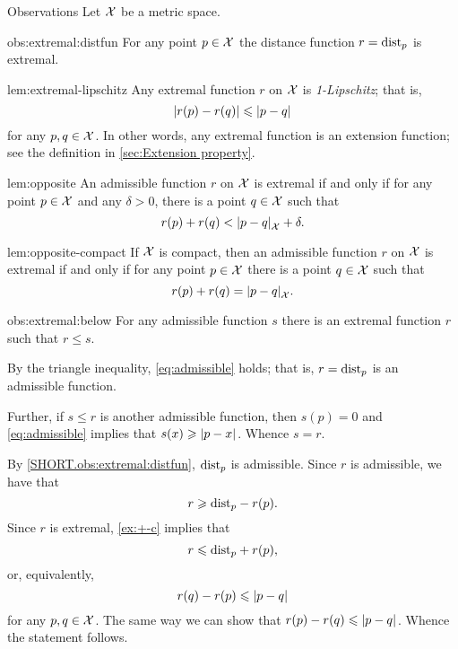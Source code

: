 \begin{thm}{Observations}\label{obs:extremal}
Let $\mathcal{X}$ be a metric space.

\begin{subthm}{obs:extremal:distfun}
For any point $p\in\mathcal{X}$
the distance function $r\z=\distfun_p$ is extremal.
\end{subthm}

\begin{subthm}{lem:extremal-lipschitz}
Any extremal function $r$ on $\mathcal{X}$ is \emph{1-Lipschitz};
that is,
\[|r(p)-r(q)|\le \dist{p}{q}{}\]
for any $p,q\in\mathcal{X}$.
In other words, any extremal function is an extension function; see the definition in \ref{sec:Extension property}.
\end{subthm}

\begin{subthm}{lem:opposite}
An admissible function $r$ on $\mathcal{X}$ is extremal if and only if
for any point $p\in\mathcal{X}$ and any $\delta>0$, there is a point $q\in \mathcal{X}$
such that 
\[r(p)+r(q)<\dist{p}{q}{\spc{X}}+\delta.\]
\end{subthm}

\begin{subthm}{lem:opposite-compact}
If $\mathcal{X}$ is compact, then an admissible function $r$ on $\mathcal{X}$ is extremal if and only if
for any point $p\in\mathcal{X}$ there is a point $q\in \mathcal{X}$
such that 
\[r(p)+r(q)=\dist{p}{q}{\spc{X}}.\]
\end{subthm}



\begin{subthm}{obs:extremal:below}
For any admissible function $s$ there is an extremal function $r$ such that $r\le s$.
\end{subthm}

\end{thm}

By the triangle inequality, \ref{eq:admissible} holds;
that is, $r=\mathrm{dist}_p$ is an admissible function.

Further, if $s\le r$ is another admissible function, then $s(p)=0$ and \ref{eq:admissible} implies that $s(x)\z\ge\dist{p}{x}{}$.
Whence $s=r$.

By \ref{SHORT.obs:extremal:distfun}, $\mathrm{dist}_p$ is admissible.
Since $r$ is admissible, we have that
\[r\geqslant \mathrm{dist}_p-r(p).\]
Since $r$ is extremal, \ref{ex:+-c} implies that
\[r\leqslant \mathrm{dist}_p+r(p),\]
or, equivalently,
\[r(q)-r(p)\le \dist{p}{q}{}\]
for any $p,q\in\mathcal{X}$.
The same way we can show that
$r(p)-r(q)\le \dist{p}{q}{}$.
Whence the statement follows.

